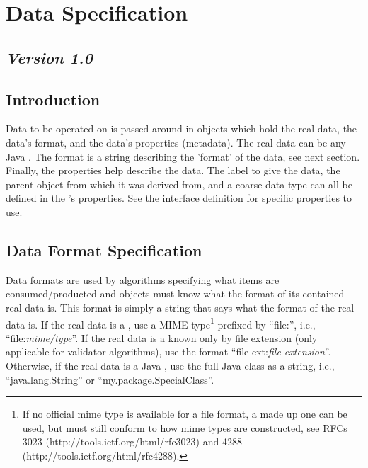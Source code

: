 %

\section{Data Specification}
\label{dataSpec}
\subsection*{\textit{Version 1.0}}
\subsection{Introduction}

Data to be operated on is passed around in  objects which hold the
real data, the data's format, and the data's properties (metadata). The real
data can be any Java . The format is a string describing the 'format' of the
data, see next section. Finally, the properties help describe the data. The label
to give the data, the parent  object from which it was derived from,
and a coarse data type can all be defined in the 's properties. See
the  interface definition for specific properties to use.

\subsection{Data Format Specification}

Data formats are used by algorithms specifying what  items are
consumed/producted and  objects must know what the format of its
contained real data is. This format is simply a string that says what the
format of the real data is. If the real data is a , use a
MIME type\footnote{If no official mime type is available for a file format, a
made up one can be used, but must still conform to how mime types are
constructed, see RFCs 3023 (http://tools.ietf.org/html/rfc3023) and 4288
(http://tools.ietf.org/html/rfc4288).} prefixed by ``file:'', i.e.,
``file:\textit{mime/type}''. If the real data is a  known
only by file extension (only applicable for validator algorithms), use the format
``file-ext:\textit{file-extension}''. Otherwise, if the real data is a Java
, use the full Java class as a string, i.e., ``java.lang.String''
or ``my.package.SpecialClass''.

